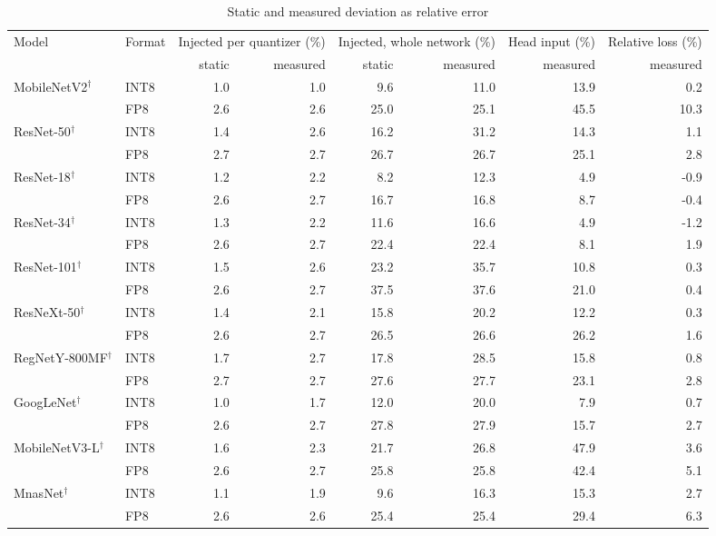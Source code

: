 \begin{table}
\footnotesize\setlength{\tabcolsep}{4pt}
\caption{Static and measured deviation as relative error}\label{tab:staticpct}
\begin{tabular}{@{}llrrrrrr@{}}
\toprule
Model & Format & \multicolumn{2}{c}{Injected per quantizer (\%)} & \multicolumn{2}{c}{Injected, whole network (\%)} & Head input (\%) & Relative loss (\%) \\
\cmidrule{3-4}\cmidrule{5-6}
 & & static & measured & static & measured & measured & measured \\
\midrule
MobileNetV2$^\dagger$ & INT8 & 1.0 & 1.0 & 9.6 & 11.0 & 13.9 & 0.2 \\
 & FP8 & 2.6 & 2.6 & 25.0 & 25.1 & 45.5 & 10.3 \\
\midrule
ResNet-50$^\dagger$ & INT8 & 1.4 & 2.6 & 16.2 & 31.2 & 14.3 & 1.1 \\
 & FP8 & 2.7 & 2.7 & 26.7 & 26.7 & 25.1 & 2.8 \\
\midrule
ResNet-18$^\dagger$ & INT8 & 1.2 & 2.2 & 8.2 & 12.3 & 4.9 & -0.9 \\
 & FP8 & 2.6 & 2.7 & 16.7 & 16.8 & 8.7 & -0.4 \\
\midrule
ResNet-34$^\dagger$ & INT8 & 1.3 & 2.2 & 11.6 & 16.6 & 4.9 & -1.2 \\
 & FP8 & 2.6 & 2.7 & 22.4 & 22.4 & 8.1 & 1.9 \\
\midrule
ResNet-101$^\dagger$ & INT8 & 1.5 & 2.6 & 23.2 & 35.7 & 10.8 & 0.3 \\
 & FP8 & 2.6 & 2.7 & 37.5 & 37.6 & 21.0 & 0.4 \\
\midrule
ResNeXt-50$^\dagger$ & INT8 & 1.4 & 2.1 & 15.8 & 20.2 & 12.2 & 0.3 \\
 & FP8 & 2.6 & 2.7 & 26.5 & 26.6 & 26.2 & 1.6 \\
\midrule
RegNetY-800MF$^\dagger$ & INT8 & 1.7 & 2.7 & 17.8 & 28.5 & 15.8 & 0.8 \\
 & FP8 & 2.7 & 2.7 & 27.6 & 27.7 & 23.1 & 2.8 \\
\midrule
GoogLeNet$^\dagger$ & INT8 & 1.0 & 1.7 & 12.0 & 20.0 & 7.9 & 0.7 \\
 & FP8 & 2.6 & 2.7 & 27.8 & 27.9 & 15.7 & 2.7 \\
\midrule
MobileNetV3-L$^\dagger$ & INT8 & 1.6 & 2.3 & 21.7 & 26.8 & 47.9 & 3.6 \\
 & FP8 & 2.6 & 2.7 & 25.8 & 25.8 & 42.4 & 5.1 \\
\midrule
MnasNet$^\dagger$ & INT8 & 1.1 & 1.9 & 9.6 & 16.3 & 15.3 & 2.7 \\
 & FP8 & 2.6 & 2.6 & 25.4 & 25.4 & 29.4 & 6.3 \\

\end{tabular}
\end{table}
